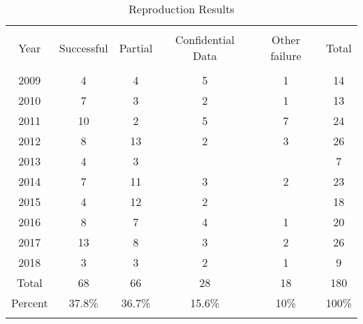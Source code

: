 \documentclass{cje_appendix} %
\theoremstyle{plain}%
\theoremstyle{definition}
\theoremstyle{remark}
\begin{document}
\FloatBarrier
\begin{table} \centering 
  \caption{Reproduction Results} 
  \label{tab:results:year} 
\begin{tabular}{@{\extracolsep{0.4pt}} cccccc} 
\\[-1.8ex]\hline 
\hline \\[-1.8ex] 
Year & Successful & Partial & Confidential Data & Other failure & Total \\ 
\hline \\[-1.8ex] 
2009 & 4 & 4 & 5 & 1 & 14 \\ 
2010 & 7 & 3 & 2 & 1 & 13 \\ 
2011 & 10 & 2 & 5 & 7 & 24 \\ 
2012 & 8 & 13 & 2 & 3 & 26 \\ 
2013 & 4 & 3 &  &  & 7 \\ 
2014 & 7 & 11 & 3 & 2 & 23 \\ 
2015 & 4 & 12 & 2 &  & 18 \\ 
2016 & 8 & 7 & 4 & 1 & 20 \\ 
2017 & 13 & 8 & 3 & 2 & 26 \\ 
2018 & 3 & 3 & 2 & 1 & 9 \\ 
Total & 68 & 66 & 28 & 18 & 180 \\ 
Percent & 37.8\% & 36.7\% & 15.6\% & 10\% & 100\% \\ 
\hline \\[-1.8ex] 
\end{tabular} 
\end{table} 
\FloatBarrier
%
\end{document}
